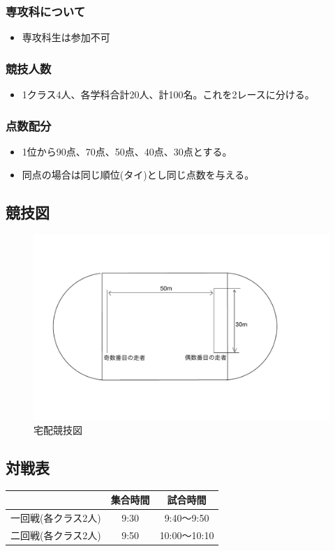 \documentclass[titlepage]{jarticle}
\begin{document}
   \subsubsection{専攻科について}
    \begin{itemize}
     \item 専攻科生は参加不可
    \end{itemize}
   \subsubsection{競技人数}
    \begin{itemize}
    \item 1クラス4人、各学科合計20人、計100名。これを2レースに分ける。
    \end{itemize}
   \subsubsection{点数配分}
    \begin{itemize}
     \item 1位から90点、70点、50点、40点、30点とする。
     \item 同点の場合は同じ順位(タイ)とし同じ点数を与える。
    \end{itemize}
  \subsection{競技図}
   \begin{figure}[H]
    \centering
    \includegraphics[width=12cm]{box2.pdf}
    \caption{宅配競技図}
   \end{figure}
  \subsection{対戦表}
   \begin{table}[H]
    \centering
    \begin{tabular}{ccc}
       &集合時間&試合時間 \\ \hline\hline
     一回戦(各クラス2人)&9:30&9:40～9:50\\
     二回戦(各クラス2人)&9:50&10:00～10:10\\
    \end{tabular}
   \end{table}
\end{document}
